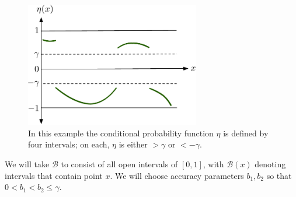 \documentclass{article}
\def\B{{\mathcal B}}
\begin{document}
\begin{figure}
\begin{center}
\includegraphics[width=3in]{oned-massart.pdf}
\end{center}
\caption{In this example the conditional probability function $\eta$ is defined by four intervals; on each, $\eta$ is either $> \gamma$ or $<-\gamma$.}
\label{fig:oned-massart}
\end{figure}

We will take $\B$ to consist of all open intervals of $[0,1]$, with $\B(x)$ denoting intervals that contain point $x$. We will choose accuracy parameters $b_1, b_2$ so that $0 < b_1 < b_2 \leq \gamma$.
\end{document}
